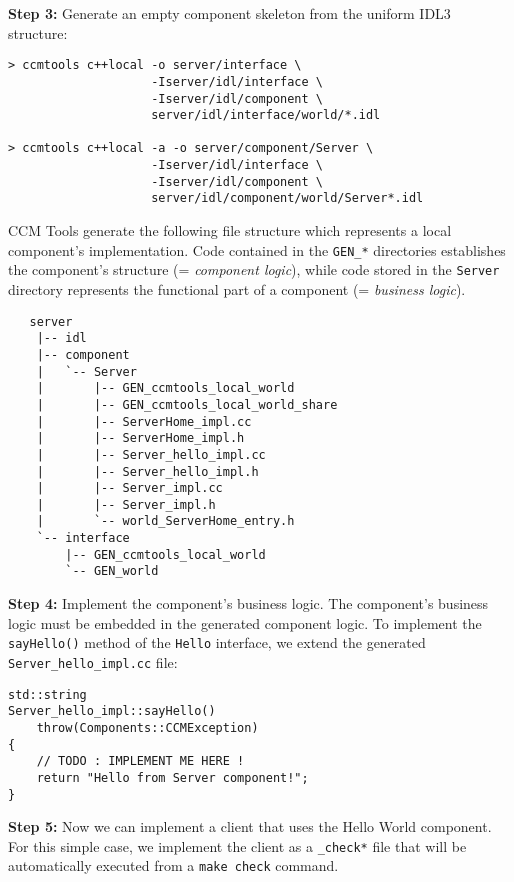 \noindent
{\bf Step 3:} Generate an empty component skeleton from the uniform IDL3 
structure:
\begin{small}
\begin{verbatim}
> ccmtools c++local -o server/interface \
                    -Iserver/idl/interface \
                    -Iserver/idl/component \
                    server/idl/interface/world/*.idl

> ccmtools c++local -a -o server/component/Server \ 
                    -Iserver/idl/interface \
                    -Iserver/idl/component \
                    server/idl/component/world/Server*.idl  
\end{verbatim}
\end{small}

\noindent
CCM Tools generate the following file structure which represents a local
component's implementation.
Code contained in the {\tt GEN\_*} directories establishes the component's
structure (= {\it component logic}), while code stored in the {\tt Server} 
directory represents the functional part of a component (= {\it business
logic}).

\begin{small}
\begin{verbatim}
   server
    |-- idl
    |-- component
    |   `-- Server
    |       |-- GEN_ccmtools_local_world
    |       |-- GEN_ccmtools_local_world_share
    |       |-- ServerHome_impl.cc
    |       |-- ServerHome_impl.h
    |       |-- Server_hello_impl.cc
    |       |-- Server_hello_impl.h
    |       |-- Server_impl.cc
    |       |-- Server_impl.h
    |       `-- world_ServerHome_entry.h
    `-- interface
        |-- GEN_ccmtools_local_world
        `-- GEN_world
\end{verbatim}
\end{small}

\noindent
{\bf Step 4:} Implement the component's business logic.
The component's business logic must be embedded in the generated
component logic. 
To implement the {\tt sayHello()} method of the {\tt Hello} interface,
we extend the generated {\tt Server\_hello\_impl.cc} file:
\begin{small}
\begin{verbatim}
std::string
Server_hello_impl::sayHello()
    throw(Components::CCMException)
{
    // TODO : IMPLEMENT ME HERE !
    return "Hello from Server component!";
}
\end{verbatim}
\end{small}


\noindent
{\bf Step 5:} Now we can implement a client that uses the Hello World
component. For this simple case, we implement the client as a {\tt \_check*}
file that will be automatically executed from a {\tt make check} command.


